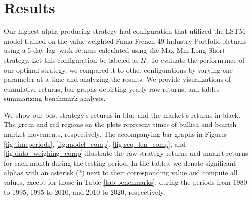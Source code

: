 \documentclass{article}
\begin{document}
\medskip

\section{Results}


Our highest alpha producing strategy had configuration that utilized the LSTM model trained on the value-weighted Fama French 49 Industry Portfolio Returns using a 5-day lag, with returns calculated using the Max-Min Long-Short strategy. Let this configuration be labeled as $H$. To evaluate the performance of our optimal strategy, we compared it to other configurations by varying one parameter at a time and analyzing the results. We provide visualizations of cumulative returns, bar graphs depicting yearly raw returns, and tables summarizing benchmark analysis.

We show our best strategy's returns in blue and the market's returns in black. The green and red regions on the plots represent times of bullish and bearish market movements, respectively. The accompanying bar graphs in Figures \ref{fig:timeperiods}, \ref{fig:model_comp}, \ref{fig:seq_len_comp}, and \ref{fig:data_weighing_comp} illustrate the raw strategy returns and market returns for each month during the testing period. In the tables, we denote significant alphas with an asterisk (*) next to their corresponding value and compute all values, except for those in Table \ref{tab:benchmarks}, during the periods from 1980 to 1995, 1995 to 2010, and 2010 to 2020, respectively.
\end{document}
